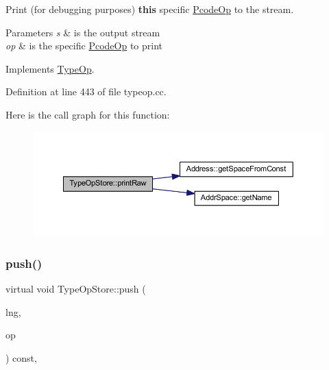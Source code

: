 Print (for debugging purposes) {\bfseries{this}} specific \mbox{\hyperlink{class_pcode_op}{Pcode\+Op}} to the stream. 


\begin{DoxyParams}{Parameters}
{\em s} & is the output stream \\
\hline
{\em op} & is the specific \mbox{\hyperlink{class_pcode_op}{Pcode\+Op}} to print \\
\hline
\end{DoxyParams}


Implements \mbox{\hyperlink{class_type_op_a60717e486917a30cc7cb6e3ce02585e1}{Type\+Op}}.



Definition at line 443 of file typeop.\+cc.

Here is the call graph for this function\+:
\nopagebreak
\begin{figure}[H]
\begin{center}
\leavevmode
\includegraphics[width=350pt]{class_type_op_store_a6cb2cfd46308c3b10ac0df9324f13115_cgraph}
\end{center}
\end{figure}
\mbox{\label{class_type_op_store_a71bd20b40e4cf78ac2c6c909a7924e61}} 
\subsubsection{\texorpdfstring{push()}{push()}}
{\footnotesize\ttfamily virtual void Type\+Op\+Store\+::push (\begin{DoxyParamCaption}\item[{\mbox{\hyperlink{class_print_language}{Print\+Language}} $\ast$}]{lng,  }\item[{const \mbox{\hyperlink{class_pcode_op}{Pcode\+Op}} $\ast$}]{op }\end{DoxyParamCaption}) const\hspace{0.3cm}{\ttfamily [inline]}, {\ttfamily [virtual]}}



